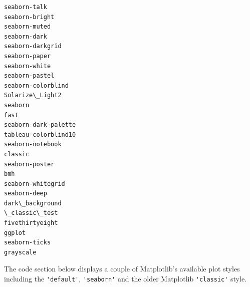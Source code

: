 \documentclass{book}
\begin{document}
    \begin{Verbatim}[commandchars=\\\{\}]
seaborn-talk
seaborn-bright
seaborn-muted
seaborn-dark
seaborn-darkgrid
seaborn-paper
seaborn-white
seaborn-pastel
seaborn-colorblind
Solarize\_Light2
seaborn
fast
seaborn-dark-palette
tableau-colorblind10
seaborn-notebook
classic
seaborn-poster
bmh
seaborn-whitegrid
seaborn-deep
dark\_background
\_classic\_test
fivethirtyeight
ggplot
seaborn-ticks
grayscale

    \end{Verbatim}


    
        The code section below displays a couple of Matplotlib's available plot
styles including the \lstinline!'default'!, \lstinline!'seaborn'! and
the older Matplotlib \lstinline!'classic'! style.
    
\end{document}
